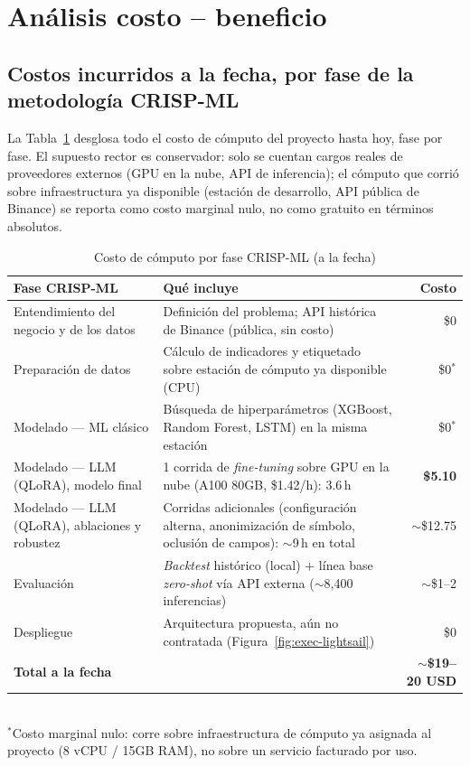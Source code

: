 \documentclass[11pt]{article}
\begin{document}
\section{An\'alisis costo -- beneficio}
\label{sec:costos}

\subsection{Costos incurridos a la fecha, por fase de la metodolog\'ia CRISP-ML}

La Tabla~\ref{tab:costos-fase} desglosa todo el costo de c\'omputo del proyecto hasta hoy, fase por fase. El supuesto rector es conservador: solo se cuentan cargos reales de proveedores externos (GPU en la nube, API de inferencia); el c\'omputo que corri\'o sobre infraestructura ya disponible (estaci\'on de desarrollo, API p\'ublica de Binance) se reporta como costo marginal nulo, no como gratuito en t\'erminos absolutos.

\begin{table}[H]
\centering
\caption{Costo de c\'omputo por fase CRISP-ML (a la fecha)}
\label{tab:costos-fase}
\small
\begin{tabularx}{\linewidth}{lXr}
\toprule
\textbf{Fase CRISP-ML} & \textbf{Qu\'e incluye} & \textbf{Costo} \\
\midrule
Entendimiento del negocio y de los datos & Definici\'on del problema; API hist\'orica de Binance (p\'ublica, sin costo) & \$0 \\
Preparaci\'on de datos & C\'alculo de indicadores y etiquetado sobre estaci\'on de c\'omputo ya disponible (CPU) & \$0$^*$ \\
Modelado --- ML cl\'asico & B\'usqueda de hiperpar\'ametros (XGBoost, Random Forest, LSTM) en la misma estaci\'on & \$0$^*$ \\
Modelado --- LLM (QLoRA), modelo final & 1 corrida de \textit{fine-tuning} sobre GPU en la nube (A100 80GB, \$1.42/h): 3.6\,h & \textbf{\$5.10} \\
Modelado --- LLM (QLoRA), ablaciones y robustez & Corridas adicionales (configuraci\'on alterna, anonimizaci\'on de s\'imbolo, oclusi\'on de campos): $\sim$9\,h en total & $\sim$\$12.75 \\
Evaluaci\'on & \textit{Backtest} hist\'orico (local) + l\'inea base \textit{zero-shot} v\'ia API externa ($\sim$8{,}400 inferencias) & $\sim$\$1--2 \\
Despliegue & Arquitectura propuesta, a\'un no contratada (Figura~\ref{fig:exec-lightsail}) & \$0 \\
\midrule
\textbf{Total a la fecha} & & \textbf{$\sim$\$19--20 USD} \\
\bottomrule
\end{tabularx}
\\[0.3em]
{\scriptsize $^*$Costo marginal nulo: corre sobre infraestructura de c\'omputo ya asignada al proyecto (8 vCPU / 15GB RAM), no sobre un servicio facturado por uso.}
\end{table}
\end{document}
